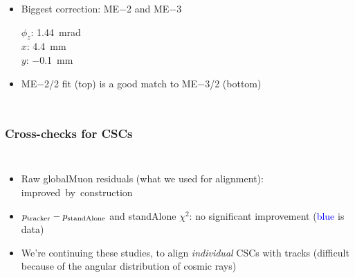 \documentclass[compress]{beamer}
\begin{document}
\begin{frame}
\begin{columns}
\begin{itemize}\setlength{\itemsep}{0.25 cm}
\item Biggest correction: ME$-$2 and ME$-$3 

$\phi_z$: 1.44~mrad \\ $x$: 4.4~mm \\ $y$: $-$0.1~mm

\item ME$-$2/2 fit (top) is a good match to ME$-$3/2 (bottom)
\end{itemize}
\end{columns}
\end{frame}

\begin{frame}
\frametitle{Cross-checks for CSCs}

\begin{columns}
\begin{itemize}
\item Raw globalMuon residuals (what we used for alignment): \mbox{improved by construction\hspace{-1 cm}}
\item $p_{\mbox{\scriptsize tracker}} - p_{\mbox{\scriptsize standAlone}}$ and standAlone $\chi^2$: no significant improvement (\textcolor{blue}{blue} is data)
\item We're continuing these studies, to align {\it individual} CSCs with tracks (difficult because of the angular distribution of cosmic rays)
\end{itemize}


\end{columns}
\end{frame}
\end{document}
